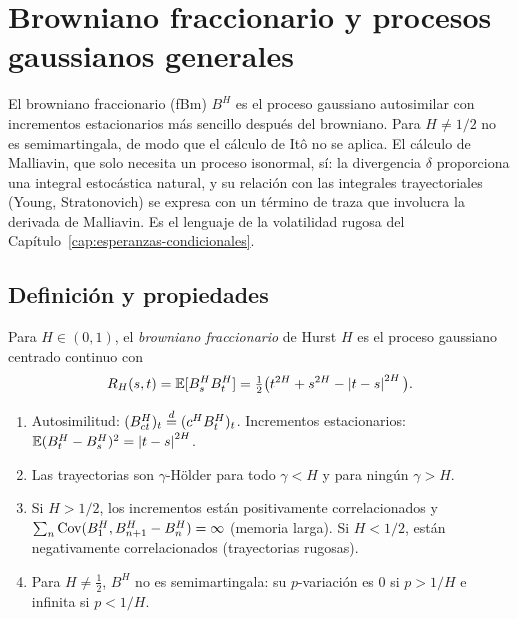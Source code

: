 \chapter{Browniano fraccionario y procesos gaussianos generales}\label{cap:fraccionario}

\begin{panorama}
El browniano fraccionario (fBm) $B^H$ es el proceso gaussiano autosimilar con incrementos
estacionarios más sencillo después del browniano. Para $H\ne1/2$ no es semimartingala,
de modo que el cálculo de Itô no se aplica. El cálculo de Malliavin, que solo necesita un
proceso isonormal, sí: la divergencia $\delta$ proporciona una integral estocástica natural, y su
relación con las integrales trayectoriales (Young, Stratonovich) se expresa con un término
de traza que involucra la derivada de Malliavin. Es el lenguaje de la volatilidad rugosa
del Capítulo~\ref{cap:esperanzas-condicionales}.
\end{panorama}

\section{Definición y propiedades}

\begin{definicion}
Para $H\in(0,1)$, el \emph{browniano fraccionario} de Hurst $H$ es el proceso
gaussiano centrado continuo con
\[
  R_H(s,t)=\mathbb{E}[B^H_sB^H_t]=\tfrac12\big(t^{2H}+s^{2H}-\left\lvert t-s\right\rvert^{2H}\big).
\]
\end{definicion}

\begin{proposicion}
\begin{enumerate}[label=(\roman*)]
  \item \textup{Autosimilitud:} $(B^H_{ct})_t\overset{d}{=}(c^HB^H_t)_t$. \textup{Incrementos estacionarios:}
  $\mathbb{E}(B^H_t-B^H_s)^2=\left\lvert t-s\right\rvert^{2H}$.
  \item Las trayectorias son $\gamma$-Hölder para todo $\gamma<H$ y para ningún $\gamma>H$.
  \item Si $H>1/2$, los incrementos están positivamente correlacionados y $\sum_n\operatorname{Cov}(B^H_1,B^H_{n+1}-
  B^H_n)=\infty$ (memoria larga). Si $H<1/2$, están negativamente correlacionados (trayectorias
  rugosas).
  \item Para $H\ne\frac12$, $B^H$ no es semimartingala: su $p$-variación es 0 si $p>1/H$ e infinita si
  $p<1/H$.
\end{enumerate}
\end{proposicion}

